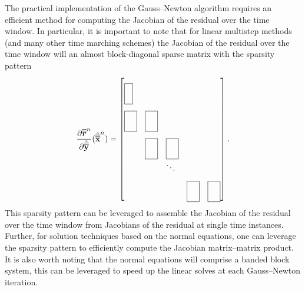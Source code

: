 The practical implementation of the Gauss--Newton algorithm requires an efficient method for computing the Jacobian of the residual over the time window. In particular, it is important to note that for linear multistep methods (and many other time marching schemes) the Jacobian of the residual over the time window will an almost block-diagonal 
sparse matrix with the sparsity pattern
\begin{equation*}
\frac{\partial \residLMSSlabArg{n}}{\partial \genstatecollocMatySlabArg{}}(\genstatecollocMatSlabArg{n})  =
 \begin{bmatrix*}[l]
\matshapeb & \\%
 \matshapea & \matshapea & \\%
 & \matshapea  & \matshapea & \\%
&  & \ddots & \\%
 & &  & \matshapea &  \matshapea 
\end{bmatrix*}.
\end{equation*}
This sparsity pattern can be leveraged to assemble the Jacobian of the residual over the time window from Jacobians of the residual at single time instances. 
Further, for solution techniques based on the normal equations, one can leverage the sparsity pattern 
to efficiently compute the Jacobian matrix--matrix product.
It is also worth noting that the 
normal equations will comprise a banded block system, this can be leveraged to speed up the linear solves at each Gauss--Newton iteration.

